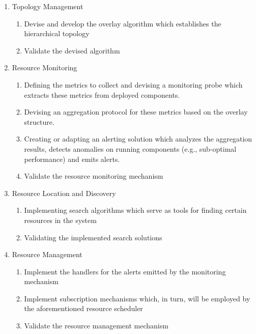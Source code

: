\begin{enumerate}
    \item Topology Management
    
    \begin{enumerate}
        \item Devise and develop the overlay algorithm which establishes the hierarchical topology
        \item Validate the devised algorithm
    \end{enumerate}
    
    \item Resource Monitoring
    
    \begin{enumerate}
        \item Defining the metrics to collect and devising a monitoring probe which extracts these metrics from deployed components.
        \item Devising an aggregation protocol for these metrics based on the overlay structure.
        \item Creating or adapting an alerting solution which analyzes the aggregation results, detects anomalies on running components (e.g., sub-optimal performance) and emits alerts.
        \item Validate the resource monitoring mechanism
    \end{enumerate}
    
    \item Resource Location and Discovery
    
    \begin{enumerate}
        \item Implementing search algorithms which serve as tools for finding certain resources in the system
        \item Validating the implemented search solutions
    \end{enumerate}
    
    \item Resource Management
    
    \begin{enumerate}
        \item Implement the handlers for the alerts emitted by the monitoring mechanism
        \item Implement subscription mechanisms which, in turn, will be employed by the aforementioned resource scheduler
        \item Validate the resource management mechanism
    \end{enumerate}


\end{enumerate}
